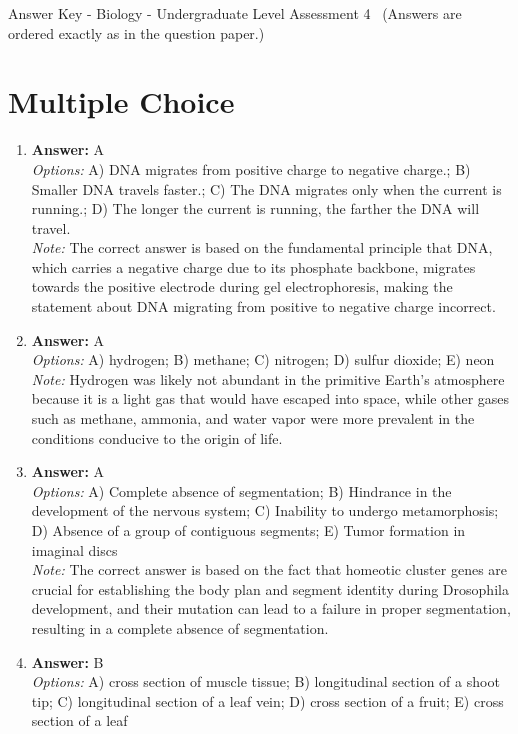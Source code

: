 \documentclass[12pt]{article}
\begin{document}
\begin{center}
Answer Key - Biology - Undergraduate Level Assessment 4 \
\small (Answers are ordered exactly as in the question paper.)
\end{center}

\section*{Multiple Choice}
\begin{enumerate}[label=\arabic*.]
\item \textbf{Answer:} A
\\ \textit{Options:} A) DNA migrates from positive charge to negative charge.; B) Smaller DNA travels faster.; C) The DNA migrates only when the current is running.; D) The longer the current is running, the farther the DNA will travel.
\\ \textit{Note:} The correct answer is based on the fundamental principle that DNA, which carries a negative charge due to its phosphate backbone, migrates towards the positive electrode during gel electrophoresis, making the statement about DNA migrating from positive to negative charge incorrect.
\item \textbf{Answer:} A
\\ \textit{Options:} A) hydrogen; B) methane; C) nitrogen; D) sulfur dioxide; E) neon
\\ \textit{Note:} Hydrogen was likely not abundant in the primitive Earth's atmosphere because it is a light gas that would have escaped into space, while other gases such as methane, ammonia, and water vapor were more prevalent in the conditions conducive to the origin of life.
\item \textbf{Answer:} A
\\ \textit{Options:} A) Complete absence of segmentation; B) Hindrance in the development of the nervous system; C) Inability to undergo metamorphosis; D) Absence of a group of contiguous segments; E) Tumor formation in imaginal discs
\\ \textit{Note:} The correct answer is based on the fact that homeotic cluster genes are crucial for establishing the body plan and segment identity during Drosophila development, and their mutation can lead to a failure in proper segmentation, resulting in a complete absence of segmentation.
\item \textbf{Answer:} B
\\ \textit{Options:} A) cross section of muscle tissue; B) longitudinal section of a shoot tip; C) longitudinal section of a leaf vein; D) cross section of a fruit; E) cross section of a leaf

\end{enumerate}
\end{document}
